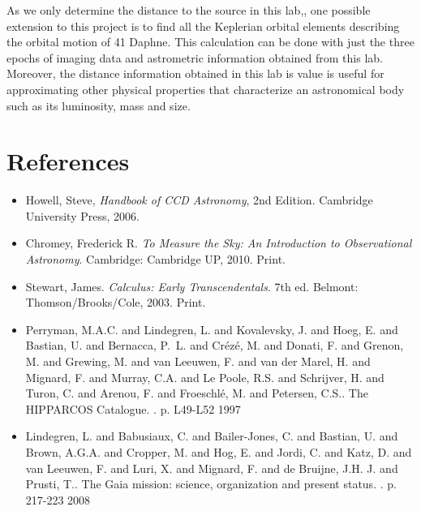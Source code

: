 \documentclass[authoryear, 12pt,5p, times]{elsarticle}
\begin{document}
As we only  determine the distance to the source in this lab,, one possible extension to this project is to find all the Keplerian orbital elements describing the orbital motion of 41 Daphne. This calculation can be done with just the three epochs of imaging data and astrometric information obtained from this lab. Moreover, the distance information obtained in this lab is value is useful for approximating other physical properties that characterize an astronomical body such as its luminosity, mass and size.
 \section*{References}

 \begin{footnotesize}
 \begin{itemize}
\item Howell, Steve,  \textit{Handbook of CCD Astronomy}, 2nd Edition. Cambridge University Press, 2006.
\item Chromey, Frederick R. \textit{To Measure the Sky: An Introduction to Observational Astronomy}. Cambridge: Cambridge UP, 2010. Print.
\item Stewart, James. \textit{Calculus: Early Transcendentals}. 7th ed. Belmont: Thomson/Brooks/Cole, 2003. Print.
\item Perryman, M.A.C. and Lindegren, L. and Kovalevsky, J. and Hoeg, E. and Bastian, U. and Bernacca, P.~L. and Cr{\'ez\'e}, M. and Donati, F. and Grenon, M. and Grewing, M. and van Leeuwen, F. and van der Marel, H. and Mignard, F. and Murray, C.A. and Le Poole, R.S. and Schrijver, H. and Turon, C. and Arenou, F. and Froeschl{\'e}, M. and Petersen, C.S.. The HIPPARCOS Catalogue. . p. L49-L52 1997
\item  Lindegren, L. and Babusiaux, C. and Bailer-Jones, C. and Bastian, U. and Brown, A.G.A. and Cropper, M. and Hog, E. and Jordi, C. and Katz, D. and van Leeuwen, F. and Luri, X. and Mignard, F. and de Bruijne, J.H. J. and Prusti, T.. The Gaia mission: science, organization and present status. . p. 217-223 2008
\end{itemize}
% 
%
  \end{footnotesize}
\end{document}
